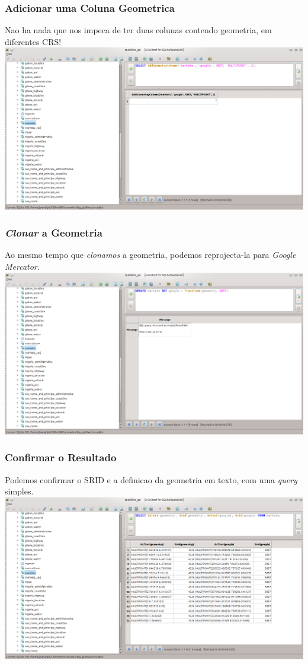 \documentclass[hyperref={pdfpagelabels=true}]{beamer}
\begin{document}
\begin{frame}
\frametitle{Adicionar uma Coluna Geometrica}
Nao ha nada que nos impeca de ter duas colunas contendo geometria, em diferentes CRS!\\
\includegraphics[scale=0.3]{distance5.png}
\end{frame}

\begin{frame}
\frametitle{\textit{Clonar} a Geometria}
Ao mesmo tempo que \textit{clonamos} a geometria, podemos reprojecta-la para \textit{Google Mercator}.\\
\includegraphics[scale=0.3]{distance6.png}
\end{frame}

\begin{frame}
\frametitle{Confirmar o Resultado}
Podemos confirmar o SRID e a definicao da geometria em texto, com uma \textit{query} simples.\\
\includegraphics[scale=0.3]{distance7.png}
\end{frame}
\end{document}
